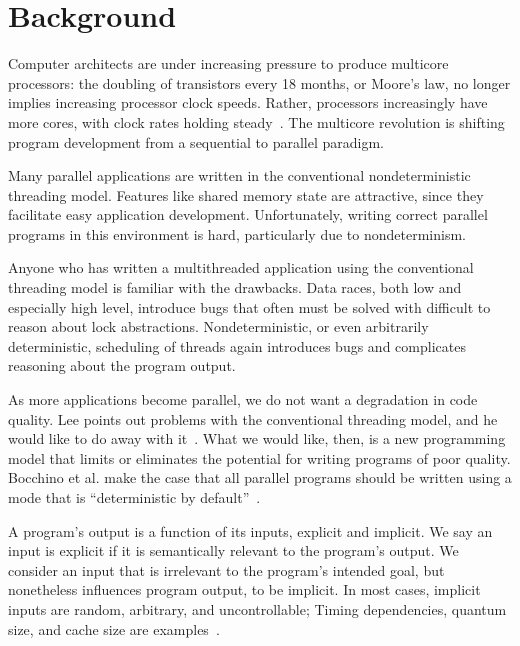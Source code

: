 
\section{Background}

Computer architects are under increasing pressure to produce multicore
processors: the doubling of transistors every 18 months, or Moore's law, no
longer implies increasing processor clock speeds. Rather, processors
increasingly have more cores, with clock rates holding
steady~\cite{bandwidth2005multicore}. The multicore revolution is shifting
program development from a sequential to parallel paradigm.

Many parallel applications are written in the conventional nondeterministic
threading model. Features like shared memory state are attractive, since they
facilitate easy application development. Unfortunately, writing correct parallel
programs in this environment is hard, particularly due to nondeterminism.

Anyone who has written a multithreaded
application using the conventional threading model is familiar with the
drawbacks. Data races, both low and especially high level, introduce bugs that
often must be solved with difficult to reason about lock abstractions.
Nondeterministic, or even arbitrarily deterministic, scheduling of threads again
introduces bugs and complicates reasoning about the program output.

As more applications become parallel, we do not want a degradation in code
quality. Lee points out problems with the conventional threading model, and he
would like to do away with it~\cite{lee2006problem}. What we would like,
then, is a new programming model that limits or eliminates the potential for
writing programs of poor quality. Bocchino et al. make the case that all
parallel programs should be written using a mode that is ``deterministic by
default''~\cite{bocchino2009parallel}.

\iffalse
\paragraph{Determinism}
\fi
A program's output is a function of its inputs, explicit and implicit.
We say an input is explicit if it is semantically relevant to the program's
output. We consider an input that is irrelevant to the program's intended goal,
but nonetheless influences program output, to be implicit. In most cases,
implicit inputs are random, arbitrary, and uncontrollable; Timing dependencies,
quantum size, and cache size are examples~\cite{Bergan11}.

